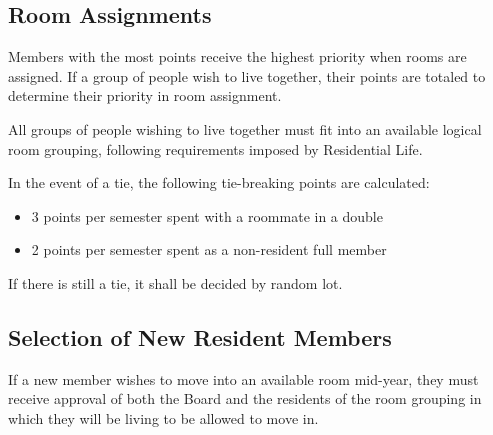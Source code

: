 	\subsection {Room Assignments}

Members with the most points receive the highest priority when rooms are assigned. If a group of people wish to live together, their points are totaled to determine their priority in room assignment.

All groups of people wishing to live together must fit into an available logical room grouping, following requirements imposed by Residential Life.

In the event of a tie, the following tie-breaking points are calculated:
\begin{itemize}
	\item 3 points per semester spent with a roommate in a double
	\item 2 points per semester spent as a non-resident full member
\end{itemize}
If there is still a tie, it shall be decided by random lot.



	\subsection {Selection of New Resident Members}

If a new member wishes to move into an available room mid-year, they must receive approval of both the Board and the residents of the room grouping in which they will be living to be allowed to move in.
